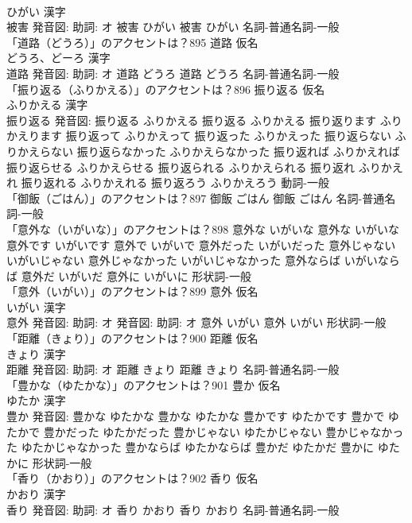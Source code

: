 \documentclass[8pt]{extreport}
\begin{document}
\begin{CJK}{UTF8}{min}
\\	ひがい 漢字　
\\	被害 発音図: 助詞: オ	被害 ひがい		被害 ひがい				名詞-普通名詞-一般 
\\	「道路（どうろ）」のアクセントは？895	道路 仮名　
\\	どうろ、どーろ 漢字　
\\	道路 発音図: 助詞: オ	道路 どうろ		道路 どうろ				名詞-普通名詞-一般 
\\	「振り返る（ふりかえる）」のアクセントは？896	振り返る 仮名　
\\	ふりかえる 漢字　
\\	振り返る 発音図:	振り返る ふりかえる		振り返る ふりかえる 振り返ります ふりかえります 振り返って ふりかえって 振り返った ふりかえった 振り返らない ふりかえらない 振り返らなかった ふりかえらなかった 振り返れば ふりかえれば 振り返らせる ふりかえらせる 振り返られる ふりかえられる 振り返れ ふりかえれ 振り返れる ふりかえれる 振り返ろう ふりかえろう				動詞-一般 
\\	「御飯（ごはん）」のアクセントは？897		御飯 ごはん		御飯 ごはん				名詞-普通名詞-一般 
\\	「意外な（いがいな）」のアクセントは？898		意外な いがいな		意外な いがいな 意外です いがいです 意外で いがいで 意外だった いがいだった 意外じゃない いがいじゃない 意外じゃなかった いがいじゃなかった 意外ならば いがいならば 意外だ いがいだ 意外に いがいに				形状詞-一般 
\\	「意外（いがい）」のアクセントは？899	意外 仮名　
\\	いがい 漢字　
\\	意外 発音図: 助詞: オ 発音図: 助詞: オ	意外 いがい		意外 いがい				形状詞-一般 
\\	「距離（きょり）」のアクセントは？900	距離 仮名　
\\	きょり 漢字　
\\	距離 発音図: 助詞: オ	距離 きょり		距離 きょり				名詞-普通名詞-一般 
\\	「豊かな（ゆたかな）」のアクセントは？901	豊か 仮名　
\\	ゆたか 漢字　
\\	豊か 発音図:	豊かな ゆたかな		豊かな ゆたかな 豊かです ゆたかです 豊かで ゆたかで 豊かだった ゆたかだった 豊かじゃない ゆたかじゃない 豊かじゃなかった ゆたかじゃなかった 豊かならば ゆたかならば 豊かだ ゆたかだ 豊かに ゆたかに				形状詞-一般 
\\	「香り（かおり）」のアクセントは？902	香り 仮名　
\\	かおり 漢字　
\\	香り 発音図: 助詞: オ	香り かおり		香り かおり				名詞-普通名詞-一般 

\end{CJK}
\end{document}
